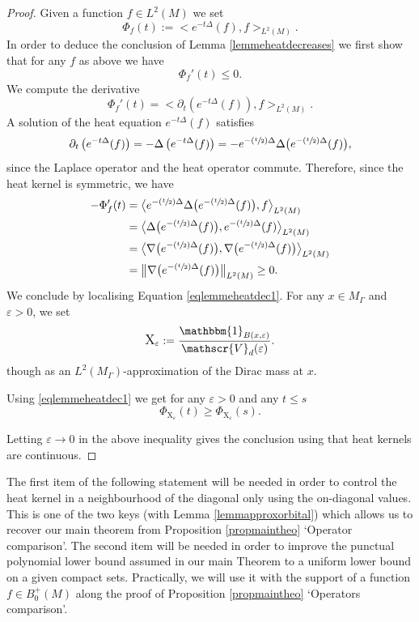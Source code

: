 \documentclass[JEP,XML,SOM,Unicode,NoFloatCountersInSection,published]{cedram}
\let\mathcal\mathscr
\let\epsilon\varepsilon
\newcommand{\Psfrac}[2]{(\sfrac{#1}{#2})}
\theoremstyle{plain}
\theoremstyle{definition}
\begin{document}
\begin{proof}
Given a function $f \in L^2(M)$ we set
\[
\Phi_f(t) := \bigl< e^{-t\Delta}(f),f \bigr>_{L^2(M)}.
\]
In order to deduce the conclusion of Lemma \ref{lemmeheatdecreases} we first show that for any $f$ as above we have
\begin{equation}
\label{eqlemmeheatdec1}
\Phi_f'(t) \le 0.
\end{equation}
We compute the derivative
\[
\Phi_f'(t) = \bigl< \partial_t \left(e^{-t\Delta} (f)\right),f \bigr>_{L^2(M)}.
\]
A solution of the heat equation $e^{-t\Delta} (f)$ satisfies
\[
\partial_t \left(e^{-t\Delta} (f) \right) = - \Delta \left(e^{-t\Delta} (f) \right) = - e^{-\Psfrac{t}{2} \Delta} \Delta \bigl(e^{-\Psfrac{t}{2}\Delta} (f) \bigr),
\]
since the Laplace operator and the heat operator commute. Therefore, since the heat kernel is symmetric, we have
\begin{align*}
- \Phi_f'(t) & = \bigl< e^{-\Psfrac{t}{2} \Delta} \Delta\bigl(e^{-\Psfrac{t}{2} \Delta}(f) \bigr),f \bigr>_{L^2(M)} \\
& = \bigl< \Delta \bigl(e^{-\Psfrac{t}{2} \Delta}(f) \bigr), e^{-\Psfrac{t}{2} \Delta}(f) \bigr>_{L^2(M)} \\
& = \bigl< \nabla \bigl(e^{-\Psfrac{t}{2} \Delta}(f) \bigr), \nabla \bigl(e^{-\Psfrac{t}{2} \Delta}(f) \bigr) \bigr>_{L^2(M)} \\
& = \bigl\Vert \nabla \bigl(e^{-\Psfrac{t}{2} \Delta}(f) \bigr) \bigr\Vert_{L^2(M)} \ge 0.
\end{align*}
We conclude by localising Equation \eqref{eqlemmeheatdec1}. For any $x \in M_{\Gamma}$ and $\epsilon > 0$, we set
\[
\text{\large{X}}_{\epsilon} := \frac{\mathbbm{1}_{B(x,\epsilon)}}{\mathcal{V}_d(\epsilon)}.
\]
though as an $L^2(M_{\Gamma})$-approximation of the Dirac mass at $x$.

Using \eqref{eqlemmeheatdec1} we get for any $\epsilon > 0$ and any $t \le s$
\[
\Phi_{\text{{X}}_{\epsilon}}(t) \ge \Phi_{\text{{X}}_{\epsilon}}(s).
\]

Letting $\epsilon \to 0$ in the above inequality gives the conclusion using that heat kernels are continuous.
\end{proof}

The first item of the following statement will be needed in order to control the heat kernel in a neighbourhood of the diagonal only using the on-diagonal values. This is one of the two keys (with Lemma \ref{lemmapproxorbital}) which allows us to recover our main theorem from Proposition \ref{propmaintheo} `Operator comparison'. The second item will be needed in order to improve the punctual polynomial lower bound assumed in our main Theorem to a uniform lower bound on a given compact sets. Practically, we will use it with the support of a function $f \in B^+_0(M)$ along the proof of Proposition \ref{propmaintheo} `Operators comparison'.
\end{document}
